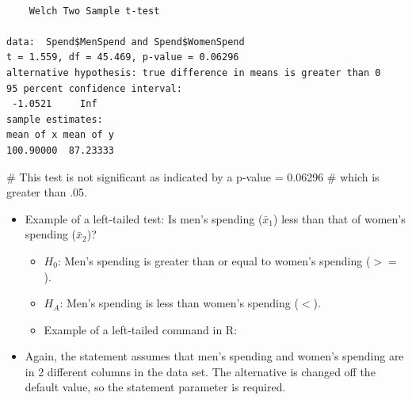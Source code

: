 \documentclass[
  letterpaper,
  DIV=11,
  numbers=noendperiod]{scrreprt}
\newenvironment{Shaded}{\begin{snugshade}}{\end{snugshade}}
\newcommand{\AttributeTok}[1]{\textcolor[rgb]{0.40,0.45,0.13}{#1}}
\newcommand{\CommentTok}[1]{\textcolor[rgb]{0.37,0.37,0.37}{#1}}
\newcommand{\FunctionTok}[1]{\textcolor[rgb]{0.28,0.35,0.67}{#1}}
\newcommand{\NormalTok}[1]{\textcolor[rgb]{0.00,0.23,0.31}{#1}}
\newcommand{\SpecialCharTok}[1]{\textcolor[rgb]{0.37,0.37,0.37}{#1}}
\newcommand{\StringTok}[1]{\textcolor[rgb]{0.13,0.47,0.30}{#1}}
\providecommand{\tightlist}{%
  \setlength{\itemsep}{0pt}\setlength{\parskip}{0pt}}\usepackage{longtable,booktabs,array}
\begin{document}
\begin{Shaded}
\end{Shaded}

\begin{verbatim}

    Welch Two Sample t-test

data:  Spend$MenSpend and Spend$WomenSpend
t = 1.559, df = 45.469, p-value = 0.06296
alternative hypothesis: true difference in means is greater than 0
95 percent confidence interval:
 -1.0521     Inf
sample estimates:
mean of x mean of y 
100.90000  87.23333 
\end{verbatim}

\begin{Shaded}
\begin{Highlighting}[]
\CommentTok{\# This test is not significant as indicated by a p{-}value = 0.06296}
\CommentTok{\# which is greater than .05.}
\end{Highlighting}
\end{Shaded}

\begin{itemize}
\tightlist
\item
  Example of a left-tailed test: Is men's spending (\(\bar{x}_1\)) less
  than that of women's spending (\(\bar{x}_2\))?

  \begin{itemize}
  \tightlist
  \item
    \(H_0\): Men's spending is greater than or equal to women's spending
    (\(>=\)).
  \item
    \(H_A\): Men's spending is less than women's spending (\(<\)).
  \item
    Example of a left-tailed command in R:
  \end{itemize}
\item
  Again, the statement assumes that men's spending and women's spending
  are in 2 different columns in the data set. The alternative is changed
  off the default value, so the statement parameter is required.
\end{itemize}

\begin{Shaded}
\end{Shaded}
\end{document}
